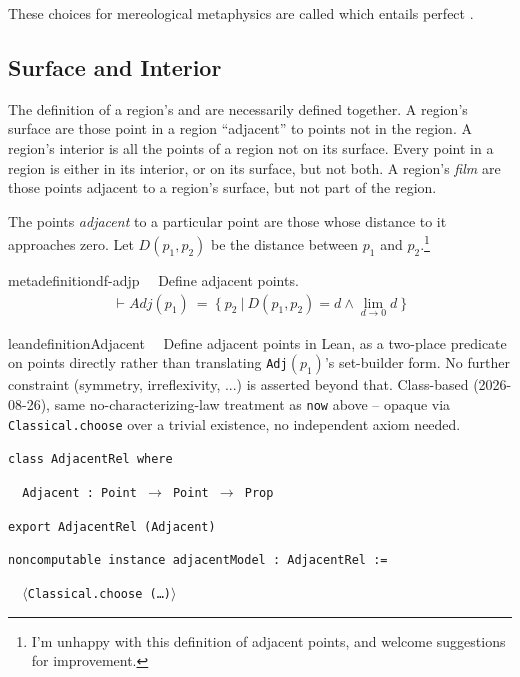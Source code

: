 \pn These choices for mereological metaphysics are called  which entails perfect .\cite{location-mereology}

\subsection{Surface and Interior}

\pn The definition of a region's  and  are necessarily defined together.  A region's surface are those point in a region ``adjacent'' to points not in the region.  A region's interior is all the points of a region not on its surface. Every point in a region is either in its interior, or on its surface, but not both.  A region's \emph{film} are those points adjacent to a region's surface, but not part of the region.

\pn The points \emph{adjacent} to a particular point are those whose distance to it approaches zero.  Let $D(p_1,p_2)$ be the distance between $p_1$ and $p_2$.\footnote{I'm unhappy with this definition of adjacent points, and welcome suggestions for improvement.}
\begin{restatable}{metadefinition}{df-adjp}~~ Define adjacent points.
\begin{align}
\vdash \textit{Adj}(p_1)~=~ \{~p_2~\vert~D(p_1,p_2) = d \wedge \lim_{d \to 0} d~\}
\label{eq:df-adjp}\tag{df-adjp}
\end{align}
\end{restatable}

\begin{restatable}{leandefinition}{Adjacent}~~ Define adjacent points in Lean, as a
two-place predicate on points directly rather than translating \texttt{Adj}$(p_1)$'s set-builder form. No
further constraint (symmetry, irreflexivity, ...) is asserted beyond that. Class-based (2026-08-26), same
no-characterizing-law treatment as \texttt{now} above -- opaque via \texttt{Classical.choose} over a
trivial existence, no independent axiom needed.

\texttt{\textcolor{leancolor}{class} \textcolor{leanyellow}{AdjacentRel} \textcolor{leancolor}{where}}

\texttt{~~Adjacent : Point $\to$ Point $\to$ Prop}

\texttt{\textcolor{leancolor}{export} AdjacentRel (Adjacent)}

\texttt{\textcolor{leancolor}{noncomputable instance} \textcolor{leanyellow}{adjacentModel} : AdjacentRel :=}

\texttt{~~$\langle$Classical.choose (\ldots)$\rangle$}
\label{Adjacent}
\end{restatable}

